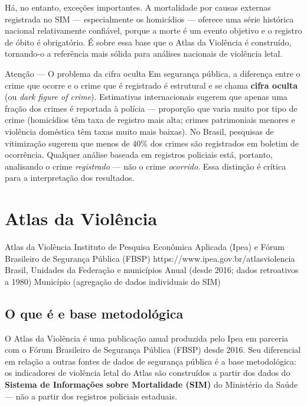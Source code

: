 Há, no entanto, exceções importantes. A mortalidade por causas externas registrada no SIM — especialmente os homicídios — oferece uma série histórica nacional relativamente confiável, porque a morte é um evento objetivo e o registro de óbito é obrigatório. É sobre essa base que o Atlas da Violência é construído, tornando-o a referência mais sólida para análises nacionais de violência letal.

\begin{boxatencao}{Atenção — O problema da cifra oculta}
Em segurança pública, a diferença entre o crime que ocorre e o crime que é registrado é estrutural e se chama \textbf{cifra oculta} (ou \textit{dark figure of crime}). Estimativas internacionais sugerem que apenas uma fração dos crimes é reportada à polícia --- proporção que varia muito por tipo de crime (homicídios têm taxa de registro mais alta; crimes patrimoniais menores e violência doméstica têm taxas muito mais baixas). No Brasil, pesquisas de vitimização sugerem que menos de 40\% dos crimes são registrados em boletim de ocorrência. Qualquer análise baseada em registros policiais está, portanto, analisando o crime \textit{registrado} --- não o crime \textit{ocorrido}. Essa distinção é crítica para a interpretação dos resultados.
\end{boxatencao}

\section{Atlas da Violência}

\ficharapida
  {Atlas da Violência}
  {Instituto de Pesquisa Econômica Aplicada (Ipea) e Fórum Brasileiro de Segurança Pública (FBSP)}
  {https://www.ipea.gov.br/atlasviolencia}
  {Brasil, Unidades da Federação e municípios}
  {Anual (desde 2016; dados retroativos a 1980)}
  {Município (agregação de dados individuais do SIM)}

\subsection{O que é e base metodológica}

O Atlas da Violência é uma publicação anual produzida pelo Ipea em parceria com o Fórum Brasileiro de Segurança Pública (FBSP) desde 2016. Seu diferencial em relação a outras fontes de dados de segurança pública é a base metodológica: os indicadores de violência letal do Atlas são construídos a partir dos dados do \textbf{Sistema de Informações sobre Mortalidade (SIM)} do Ministério da Saúde --- não a partir dos registros policiais estaduais.

